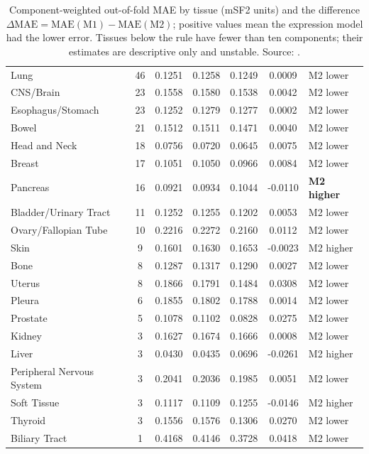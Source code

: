 \begin{table}[tbp]
  \caption[Tissue-specific performance]{Component-weighted out-of-fold MAE by tissue
    (mSF2 units) and the difference $\Delta\mathrm{MAE}=\mathrm{MAE(M1)}-\mathrm{MAE(M2)}$;
    positive values mean the expression model had the lower error. Tissues below the rule
    have fewer than ten components; their estimates are descriptive only and unstable.
    Source: .}
  \label{tab:tissue}
  \small
  \begin{tabular}{@{}l S[table-format=2.0] S[table-format=1.4] S[table-format=1.4]
      S[table-format=1.4] S[table-format=-1.4] l@{}}
    \toprule
     & {} & {} & {}
      & {} & {} &  \\
    \midrule
    Lung & 46 & 0.1251 & 0.1258 & 0.1249 & 0.0009 & M2 lower \\
    CNS/Brain & 23 & 0.1558 & 0.1580 & 0.1538 & 0.0042 & M2 lower \\
    Esophagus/Stomach & 23 & 0.1252 & 0.1279 & 0.1277 & 0.0002 & M2 lower \\
    Bowel & 21 & 0.1512 & 0.1511 & 0.1471 & 0.0040 & M2 lower \\
    Head and Neck & 18 & 0.0756 & 0.0720 & 0.0645 & 0.0075 & M2 lower \\
    Breast & 17 & 0.1051 & 0.1050 & 0.0966 & 0.0084 & M2 lower \\
    Pancreas & 16 & 0.0921 & 0.0934 & 0.1044 & -0.0110 & \textbf{M2 higher} \\
    Bladder/Urinary Tract & 11 & 0.1252 & 0.1255 & 0.1202 & 0.0053 & M2 lower \\
    Ovary/Fallopian Tube & 10 & 0.2216 & 0.2272 & 0.2160 & 0.0112 & M2 lower \\
    \midrule
    Skin & 9 & 0.1601 & 0.1630 & 0.1653 & -0.0023 & M2 higher \\
    Bone & 8 & 0.1287 & 0.1317 & 0.1290 & 0.0027 & M2 lower \\
    Uterus & 8 & 0.1866 & 0.1791 & 0.1484 & 0.0308 & M2 lower \\
    Pleura & 6 & 0.1855 & 0.1802 & 0.1788 & 0.0014 & M2 lower \\
    Prostate & 5 & 0.1078 & 0.1102 & 0.0828 & 0.0275 & M2 lower \\
    Kidney & 3 & 0.1627 & 0.1674 & 0.1666 & 0.0008 & M2 lower \\
    Liver & 3 & 0.0430 & 0.0435 & 0.0696 & -0.0261 & M2 higher \\
    Peripheral Nervous System & 3 & 0.2041 & 0.2036 & 0.1985 & 0.0051 & M2 lower \\
    Soft Tissue & 3 & 0.1117 & 0.1109 & 0.1255 & -0.0146 & M2 higher \\
    Thyroid & 3 & 0.1556 & 0.1576 & 0.1306 & 0.0270 & M2 lower \\
    Biliary Tract & 1 & 0.4168 & 0.4146 & 0.3728 & 0.0418 & M2 lower \\
    \bottomrule
  \end{tabular}
\end{table}

